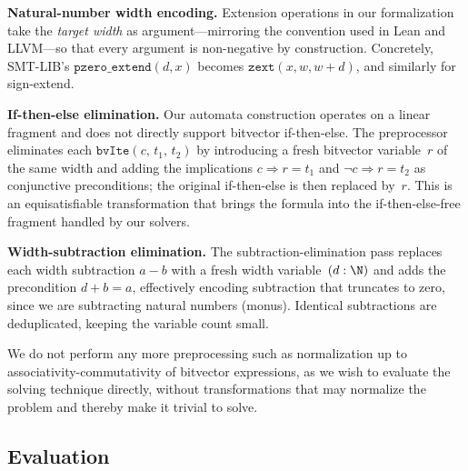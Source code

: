 \noindent\textbf{Natural-number width encoding.}
Extension operations in our formalization take the \emph{target width}
as argument---mirroring the convention used in Lean and LLVM---so that every
argument is non-negative by construction.
Concretely, SMT-LIB's $\texttt{pzero\_extend}(d, x)$ becomes
$\texttt{zext}(x, w, w{+}d)$, and similarly for sign-extend.

\noindent\textbf{If-then-else elimination.}
Our automata construction operates on a linear fragment and does not
directly support bitvector if-then-else.
The preprocessor eliminates each $\texttt{bvIte}(c,\, t_1,\, t_2)$
by introducing a fresh bitvector variable~$r$ of the same width
and adding the implications
$c \Rightarrow r = t_1$ and $\lnot c \Rightarrow r = t_2$
as conjunctive preconditions; the original if-then-else is then replaced by~$r$.
This is an equisatisfiable transformation that brings the formula
into the if-then-else-free fragment handled by our solvers.

\noindent\textbf{Width-subtraction elimination.}
The subtraction-elimination pass replaces each width subtraction $a - b$
with a fresh width variable~$(d : \N)$ and adds the precondition $d + b = a$,
effectively encoding subtraction that truncates to zero, since we are subtracting natural numbers (monus).
Identical subtractions are deduplicated, keeping the variable count small.

We do not perform any more preprocessing such as normalization up to associativity-commutativity of bitvector expressions,
as we wish to evaluate the solving technique directly, without transformations that may normalize the problem and thereby make it trivial to solve.

\subsection{Evaluation}
\label{sec:mwbv:evaluation}

